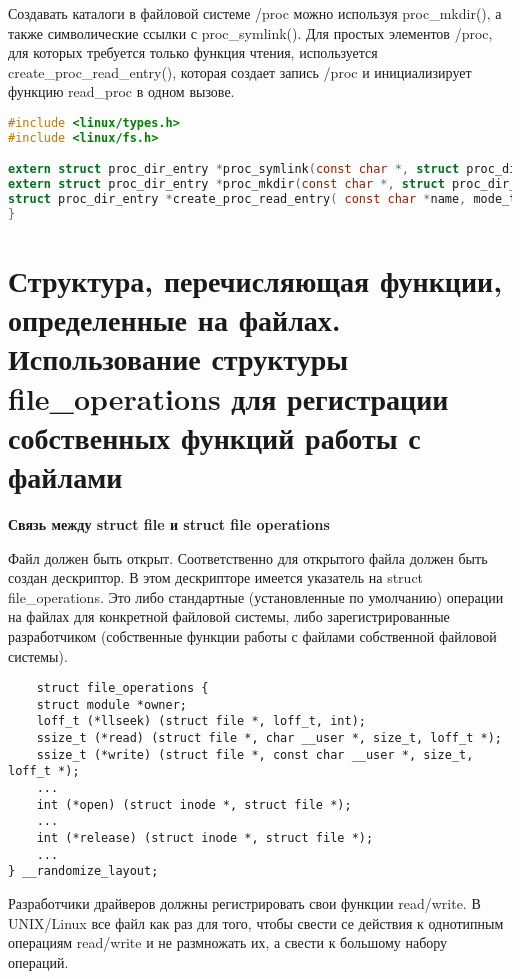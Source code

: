 Создавать каталоги в файловой системе /proc можно используя proc\_mkdir(), а также символические ссылки с proc\_symlink(). Для простых элементов /proc, для которых требуется только функция чтения, используется create\_proc\_read\_entry(), которая создает запись /proc и инициализирует функцию read\_proc в одном вызове.

\begin{lstlisting}[language=C, label=lst:1, caption= Хз чо это]
#include <linux/types.h>
#include <linux/fs.h>

extern struct proc_dir_entry *proc_symlink(const char *, struct proc_dir_entry *, const char *);
extern struct proc_dir_entry *proc_mkdir(const char *, struct proc_dir_entry *);
struct proc_dir_entry *create_proc_read_entry( const char *name, mode_t mode, struct proc_dir_entry *base, read_proc_t *read_proc, void *data );
}
\end{lstlisting}

\section{Структура, перечисляющая функции, определенные на файлах. Использование структуры file\_operations для регистрации собственных функций работы с файлами}

\textbf{Связь между struct file и struct file operations}

Файл должен быть открыт. Соответственно для открытого файла должен быть создан дескриптор. В этом дескрипторе имеется указатель на struct file\_operations. Это либо стандартные (установленные по умолчанию) операции на файлах для конкретной файловой системы, либо зарегистрированные разработчиком (собственные функции работы с файлами собственной файловой системы).

\begin{lstlisting}
	struct file_operations {
	struct module *owner;
	loff_t (*llseek) (struct file *, loff_t, int);
	ssize_t (*read) (struct file *, char __user *, size_t, loff_t *);
	ssize_t (*write) (struct file *, const char __user *, size_t, loff_t *);
	...
	int (*open) (struct inode *, struct file *);
	...
	int (*release) (struct inode *, struct file *);
	...
} __randomize_layout;
\end{lstlisting}

Разработчики драйверов должны регистрировать свои функции read/write. В UNIX/Linux все файл как раз для того, чтобы свести се действия к однотипным операциям read/write и не размножать их, а свести к большому набору операций.

